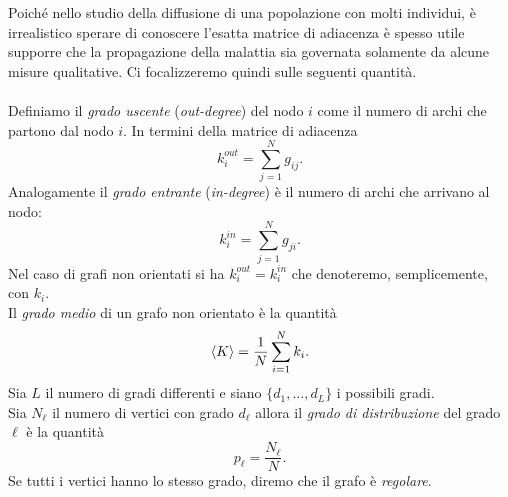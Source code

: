 Poich\'e nello studio della diffusione di una popolazione con molti individui, \`e irrealistico sperare di conoscere l'esatta matrice di adiacenza \`e spesso utile supporre che la propagazione della malattia sia governata solamente da alcune misure qualitative. Ci focalizzeremo quindi sulle seguenti quantit\`a.\\ \\
Definiamo il \textit{grado uscente} (\textit{out-degree})  del nodo $i$  come il numero di archi che partono dal nodo $i$. In termini della matrice di adiacenza
$$ k_i^{out} =\sum_{j=1}^N g_{ij}.$$
Analogamente il \textit{grado entrante} (\textit{in-degree}) \`e il numero di archi che arrivano al nodo:
$$ k_i^{in} = \sum_{j=1}^N g_{ji}.$$
Nel caso di grafi non orientati si ha $k_i^{out} = k_i^{in}$ che denoteremo, semplicemente, con $k_i$.\\
Il \textit{grado medio} di un grafo non orientato \`e la quantit\`a 
$$ \langle K \rangle = \frac{1}{N}\sum_{i=1}^N k_i.$$
Sia $L$ il numero di gradi differenti e siano $\{ d_1, \dots, d_L\}$ i possibili gradi.\\
Sia $N_\ell$ il numero di vertici con grado $d_\ell$ allora il \textit{grado di distribuzione} del grado $\ell$ \`e la quantit\`a
$$ p_\ell = \frac{N_\ell}{N}.$$
Se tutti i vertici hanno lo stesso grado, diremo che il grafo \`e \textit{regolare}.\\  \\
%
